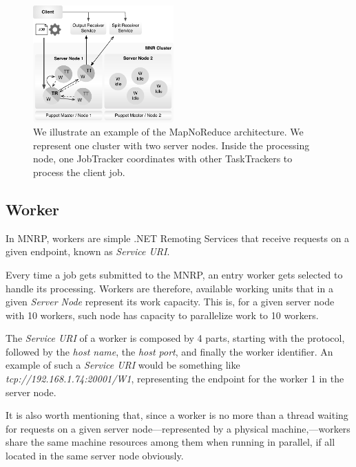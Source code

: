 \documentclass[times, 10pt,twocolumn]{article}
\begin{document}
        \begin{figure}[!h]
            \begin{center}
                \includegraphics[width=0.48\textwidth]{pics/architecture.pdf}
                \caption{We illustrate an example of the MapNoReduce architecture. We represent one cluster with two server nodes. Inside the processing node, one JobTracker coordinates with other TaskTrackers to process the client job.  }
                \label{fig:mnr-architecture}
            \end{center}
        \end{figure}

    	\subsection{Worker}

        In \ac{MNRP}, workers are simple .NET Remoting Services that receive requests on a given endpoint, known as \emph{Service URI}.

        Every time a job gets submitted to the \ac{MNRP}, an entry worker gets selected to handle its processing. Workers are therefore, available working units that in a given \emph{Server Node} represent its work capacity. This is, for a given server node with 10 workers, such node has capacity to parallelize work to 10 workers.

        The \emph{Service URI} of a worker is composed by 4 parts, starting with the protocol, followed by the \emph{host name}, the \emph{host port}, and finally the worker identifier. An example of such a \emph{Service URI} would be something like \emph{{\small tcp://192.168.1.74:20001/W1}}, representing the endpoint for the worker 1 in the server node.
        
        It is also worth mentioning that, since a worker is no more than a thread waiting for requests on a given server node—represented by a physical machine,—workers share the same machine resources among them when running in parallel, if all located in the same server node obviously.
\end{document}
